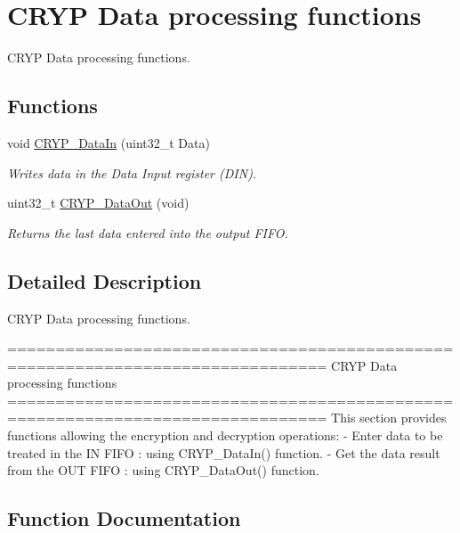 \hypertarget{group___c_r_y_p___group2}{}\section{C\+R\+Y\+P Data processing functions}
\label{group___c_r_y_p___group2}


C\+R\+Y\+P Data processing functions.  


\subsection*{Functions}
\begin{DoxyCompactItemize}
\item 
void \hyperlink{group___c_r_y_p___group2_ga16dc76244318d464357ee6ff208bf9a4}{C\+R\+Y\+P\+\_\+\+Data\+In} (uint32\+\_\+t Data)
\begin{DoxyCompactList}\small\item\em Writes data in the Data Input register (D\+I\+N). \end{DoxyCompactList}\item 
uint32\+\_\+t \hyperlink{group___c_r_y_p___group2_gacbe5fcf4c7e4919192376fa615588b54}{C\+R\+Y\+P\+\_\+\+Data\+Out} (void)
\begin{DoxyCompactList}\small\item\em Returns the last data entered into the output F\+I\+F\+O. \end{DoxyCompactList}\end{DoxyCompactItemize}


\subsection{Detailed Description}
C\+R\+Y\+P Data processing functions. 

\begin{DoxyVerb} ===============================================================================
                      CRYP Data processing functions
 ===============================================================================  
  This section provides functions allowing the encryption and decryption 
  operations: 
  - Enter data to be treated in the IN FIFO : using CRYP_DataIn() function.
  - Get the data result from the OUT FIFO : using CRYP_DataOut() function.\end{DoxyVerb}
 

\subsection{Function Documentation}
\hypertarget{group___c_r_y_p___group2_ga16dc76244318d464357ee6ff208bf9a4}{}
